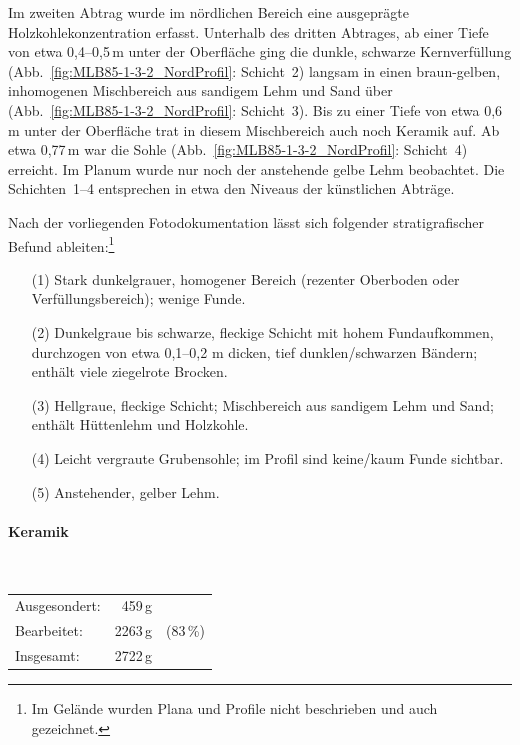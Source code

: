 \begin{table}[tb]
	\centering
	{\footnotesize }
	\caption{MLB~85/1-3-2: Anteil verschiedener Fundmaterialien.}
	\label{tab:MLB85-1-3-2_Funde}
\end{table}

Im zweiten Abtrag wurde im nördlichen Bereich eine ausgeprägte Holzkohlekonzentration erfasst. Unterhalb des dritten Abtrages, ab einer Tiefe von etwa 0,4--0,5\,m unter der Oberfläche ging die dunkle, schwarze Kernverfüllung (Abb.~\ref{fig:MLB85-1-3-2_NordProfil}: Schicht~2) langsam in einen braun-gelben, inhomogenen Mischbereich aus sandigem Lehm und Sand über (Abb.~\ref{fig:MLB85-1-3-2_NordProfil}: Schicht~3). Bis zu einer Tiefe von etwa 0,6\,m unter der Oberfläche trat in diesem Mischbereich auch noch Keramik auf. Ab etwa 0,77\,m war die Sohle (Abb.~\ref{fig:MLB85-1-3-2_NordProfil}: Schicht~4) erreicht. Im Planum wurde nur noch der anstehende gelbe Lehm beobachtet. Die Schichten~1--4 entsprechen in etwa den Niveaus der künstlichen Abträge.

\vspace{.5em}\noindent Nach der vorliegenden Fotodokumentation lässt sich folgender stratigrafischer Befund ableiten:\footnote{Im Gelände wurden Plana und Profile nicht beschrieben und auch gezeichnet.}
\begin{itemize}[leftmargin=*, labelindent=0.5em, noitemsep, topsep=0pt]
	\item [(1)] Stark dunkelgrauer, homogener Bereich (rezenter Oberboden oder Verfüllungsbereich); wenige Funde.
	\item [(2)] Dunkelgraue bis schwarze, fleckige Schicht mit hohem Fundaufkommen, durchzogen von etwa 0,1--0,2 m dicken, tief dunklen/schwarzen Bändern; enthält viele ziegelrote Brocken.
	\item [(3)] Hellgraue, fleckige Schicht; Mischbereich aus sandigem Lehm und Sand; enthält Hüttenlehm und Holzkohle.
	\item [(4)] Leicht vergraute Grubensohle; im Profil sind keine/kaum Funde sichtbar.
	\item [(5)] Anstehender, gelber Lehm.
\end{itemize}

\paragraph{Keramik\vspace{.5em}}\mbox{}\\
\begin{tabular}{@{}lrl@{}}
Ausgesondert: & 459\,g & \\
Bearbeitet: & 2263\,g & (83\,\%) \\
Insgesamt: & 2722\,g & \\
\end{tabular} 

